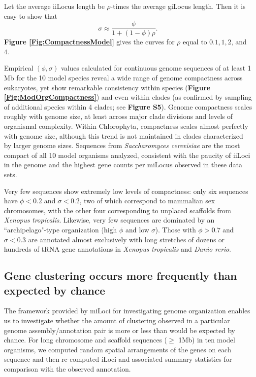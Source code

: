 Let the average iiLocus length be $\rho$-times the average giLocus length.
Then it is easy to show that
$$\sigma \approx \frac{\phi}{1 + (1-\phi)\rho}.$$
\textbf{Figure \ref{Fig:CompactnessModel}} gives the curves for $\rho$ equal to $0.1, 1, 2$, and $4$.

Empirical $(\phi,\sigma)$ values calculated for continuous genome sequences of at least 1 Mb for the 10 model species reveal a wide range of genome compactness across eukaryotes, yet show remarkable consistency within species (\textbf{Figure \ref{Fig:ModOrgCompactness}}) and even within clades (as confirmed by sampling of additional species within 4 clades; see \textbf{Figure S5}).
Genome compactness scales roughly with genome size, at least across major clade divisions and levels of organismal complexity.
Within Chlorophyta, compactness scales almost perfectly with genome size, although this trend is not maintained in clades characterized by larger genome sizes.
Sequences from \textit{Saccharomyces cerevisiae} are the most compact of all 10 model organisms analyzed, consistent with the paucity of iiLoci in the genome and the highest gene counts per miLocus observed in these data sets.

Very few sequences show extremely low levels of compactness: only six sequences have $\phi < 0.2$ and $\sigma < 0.2$, two of which correspond to mammalian sex chromosomes, with the other four corresponding to unplaced scaffolds from \textit{Xenopus tropicalis}.
Likewise, very few sequences are dominated by an ``archipelago"-type organization (high $\phi$ and low $\sigma$).
Those with $\phi > 0.7$ and $\sigma < 0.3$ are annotated almost exclusively with long stretches of dozens or hundreds of tRNA gene annotations in \textit{Xenopus tropicalis} and \textit{Danio rerio}.

\subsection{Gene clustering occurs more frequently than expected by chance}

The framework provided by miLoci for investigating genome organization enables us to investigate whether the amount of clustering observed in a particular genome assembly/annotation pair is more or less than would be expected by chance.
For long chromosome and scaffold sequences ($\geq$ 1Mb) in ten model organisms, we computed random spatial arrangements of the genes on each sequence and then re-computed iLoci and associated summary statistics for comparison with the observed annotation.

